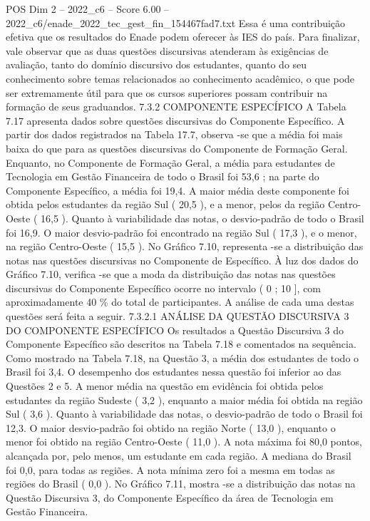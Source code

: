 \begin{textsample}{POS Dim 2 – 2022\_c6 – Score 6.00 – 2022\_c6/enade\_2022\_tec\_gest\_fin\_154467fad7.txt}
Essa é uma contribuição efetiva que os resultados do Enade podem oferecer às IES do país.
Para finalizar, vale observar que as duas questões discursivas atenderam às exigências de avaliação, tanto do domínio discursivo dos estudantes, quanto do seu conhecimento sobre temas relacionados ao conhecimento acadêmico, o que pode ser extremamente útil para que os cursos superiores possam contribuir na formação de seus graduandos. 7.3.2 COMPONENTE ESPECÍFICO A Tabela 7.17 apresenta dados sobre questões discursivas do Componente Específico.
A partir dos dados registrados na Tabela 17.7, observa -se que a média foi mais baixa do que para as questões discursivas do Componente de Formação Geral.
Enquanto, no Componente de Formação Geral, a média para estudantes de Tecnologia em Gestão Financeira de todo o Brasil foi 53,6 ; na parte do Componente Específico, a média foi 19,4.
A maior média deste componente foi obtida pelos estudantes da região Sul ( 20,5 ), e a menor, pelos da região Centro-Oeste ( 16,5 ).
Quanto à variabilidade das notas, o desvio-padrão de todo o Brasil foi 16,9.
O maior desvio-padrão foi encontrado na região Sul ( 17,3 ), e o menor, na região Centro-Oeste ( 15,5 ).
No Gráfico 7.10, representa -se a distribuição das notas nas questões discursivas no Componente de Específico.
À luz dos dados do Gráfico 7.10, verifica -se que a moda da distribuição das notas nas questões discursivas do Componente Específico ocorre no intervalo ( 0 ; 10 ], com aproximadamente 40 \% do total de participantes.
A análise de cada uma destas questões será feita a seguir. 7.3.2.1 ANÁLISE DA QUESTÃO DISCURSIVA 3 DO COMPONENTE ESPECÍFICO Os resultados a Questão Discursiva 3 do Componente Específico são descritos na Tabela 7.18 e comentados na sequência.
Como mostrado na Tabela 7.18, na Questão 3, a média dos estudantes de todo o Brasil foi 3,4.
O desempenho dos estudantes nessa questão foi inferior ao das Questões 2 e 5.
A menor média na questão em evidência foi obtida pelos estudantes da região Sudeste ( 3,2 ), enquanto a maior média foi obtida na região Sul ( 3,6 ).
Quanto à variabilidade das notas, o desvio-padrão de todo o Brasil foi 12,3.
O maior desvio-padrão foi obtido na região Norte ( 13,0 ), enquanto o menor foi obtido na região Centro-Oeste ( 11,0 ).
A nota máxima foi 80,0 pontos, alcançada por, pelo menos, um estudante em cada região.
A mediana do Brasil foi 0,0, para todas as regiões.
A nota mínima zero foi a mesma em todas as regiões do Brasil ( 0,0 ).
No Gráfico 7.11, mostra -se a distribuição das notas na Questão Discursiva 3, do Componente Específico da área de Tecnologia em Gestão Financeira.

\end{textsample}
